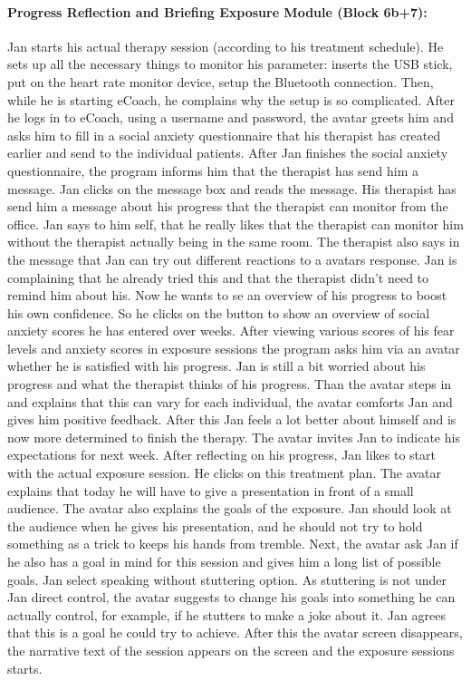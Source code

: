 \paragraph{Progress Reflection and Briefing Exposure Module (Block 6b+7): }
Jan starts his actual therapy session (according to his treatment schedule). He sets up all the necessary things to monitor his parameter: inserts the USB stick, put on the heart rate monitor device, setup the Bluetooth connection. Then, while he is starting eCoach, he complains why the setup is so complicated. After he logs in to eCoach, using a username and password, the avatar greets him and asks him to fill in a social anxiety questionnaire that his therapist has created earlier and send to the individual patients. \newline
After Jan finishes the social anxiety questionnaire, the program informs him that the therapist has send him a message. Jan clicks on the message box and reads the message. His therapist has send him a message about his progress that the therapist can monitor from the office. Jan says to him self, that he really likes that the therapist can monitor him without the therapist actually being in the same room. The therapist also says in the message that Jan can try out different reactions to a avatars response. Jan is complaining that he already tried this and that the therapist didn't need to remind him about his. \newline
Now he wants to se an overview of his progress to boost his own confidence. So he clicks on the button to show an overview of social anxiety scores he has entered over weeks. After viewing various scores of his fear levels and anxiety scores in exposure sessions the program asks him via an avatar  whether he is satisfied with his progress. Jan is still a bit worried about his progress and what the therapist thinks of his progress. Than the avatar steps in and explains that this can vary for each individual, the avatar comforts Jan and gives him positive feedback. After this Jan feels a lot better about himself and is now more determined to finish the therapy.\newline
The avatar invites Jan to indicate his expectations for next week. After reflecting on his progress, Jan likes to start with the actual exposure session. He clicks on this treatment plan. The avatar explains that today he will have to give a presentation in front of a small audience. The avatar also explains the goals of the exposure. Jan should look at the audience when he gives his presentation, and he should not try to hold something as a trick to keeps his hands from tremble. Next, the avatar ask Jan if he also has a goal in mind for this session and gives him a long list of possible goals. Jan select speaking without stuttering option. As stuttering is not under Jan direct control, the avatar suggests to change his goals into something he can actually control, for example, if he stutters to make a joke about it. Jan agrees that this is a goal he could try to achieve. After this the avatar screen disappears, the narrative text of the session appears on the screen and the exposure sessions starts. \newline
